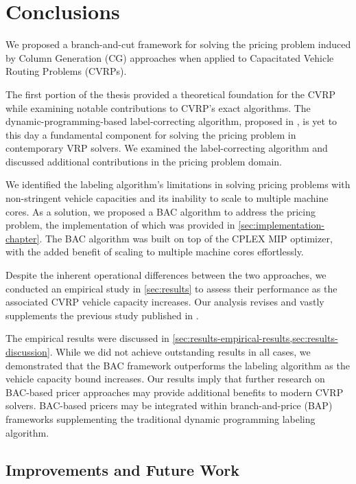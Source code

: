 \chapter{Conclusions}
\label{sec:conclusions}

We proposed a branch-and-cut framework for solving the pricing problem
induced by Column Generation (CG) approaches when applied to
Capacitated Vehicle Routing Problems (CVRPs).

The first portion of the thesis provided a theoretical foundation for the CVRP
while examining notable contributions to CVRP's exact algorithms.
The dynamic-programming-based label-correcting algorithm,
proposed in \textcite{desrochers1992, feillet2004},
is yet to this day a fundamental component for solving the pricing problem
in contemporary VRP solvers.
We examined the label-correcting algorithm
and discussed additional contributions in the pricing problem domain.

\medskip

We identified the labeling algorithm's limitations in solving pricing problems
with non-stringent vehicle capacities
and its inability to scale to multiple machine cores.
As a solution, we proposed a BAC algorithm to address the pricing problem,
the implementation of which was provided in \cref{sec:implementation-chapter}.
The BAC algorithm was built on top of the CPLEX MIP optimizer,
with the added benefit of scaling to multiple machine cores effortlessly.

Despite the inherent operational differences between the two approaches, we conducted an empirical study in \cref{sec:results}
to assess their performance as the associated CVRP vehicle capacity increases.
Our analysis revises and vastly supplements the previous study published in \textcite{jepsen2014}.

\medskip

The empirical results were discussed in \cref{sec:results-empirical-results,sec:results-discussion}.
While we did not achieve outstanding results in all cases,
we demonstrated that the BAC framework outperforms
the labeling algorithm as the vehicle capacity bound increases.
Our results imply that further research on BAC-based pricer approaches
may provide additional benefits to modern CVRP solvers.
BAC-based pricers may be integrated within branch-and-price (BAP) frameworks
supplementing the traditional dynamic programming labeling algorithm.

\section{Improvements and Future Work}
\label{sec:conclusions-improvements-and-future-work}

